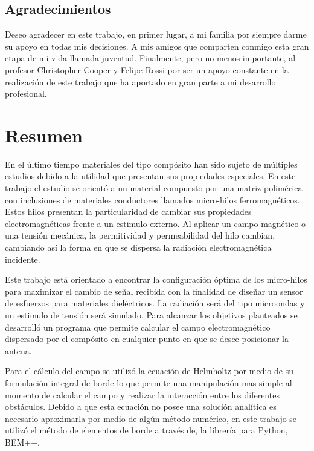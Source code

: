 \documentclass[12pt,letterpaper]{article}
\numberwithin{equation}{section}
\begin{document}
\begin{center}
	\section*{Agradecimientos}

	Deseo agradecer en este trabajo, en primer lugar, a mi familia por siempre darme su apoyo en todas mis decisiones. A mis amigos que comparten conmigo esta gran etapa de mi vida llamada juventud. Finalmente, pero no menos importante, al profesor Christopher Cooper y Felipe Rossi por ser un apoyo constante en la realización de este trabajo que ha aportado en gran parte a mi desarrollo profesional.

\end{center}


\pagebreak
\section*{Resumen}
En el último tiempo materiales del tipo compósito han sido sujeto de múltiples estudios debido a la utilidad que presentan sus propiedades especiales. En este trabajo el estudio se orientó a un material compuesto por una matriz polimérica con inclusiones de materiales conductores llamados micro-hilos ferromagnéticos. Estos hilos presentan la particularidad de cambiar sus propiedades electromagnéticas frente a un estimulo externo. Al aplicar un campo magnético o una tensión mecánica, la permitividad y permeabilidad del hilo cambian, cambiando así la forma en que se dispersa la radiación electromagnética incidente.

Este trabajo está orientado a encontrar la configuración óptima de los micro-hilos para maximizar el cambio de señal recibida con la finalidad de diseñar un sensor de esfuerzos para materiales dieléctricos. La radiación será del tipo microondas y un estimulo de tensión será simulado. Para alcanzar los objetivos planteados se desarrolló un programa que permite calcular el campo electromagnético dispersado por el compósito en cualquier punto en que se desee posicionar la antena.

Para el cálculo del campo se utilizó la ecuación de Helmholtz por medio de su formulación integral de borde lo que permite una manipulación mas simple al momento de calcular el campo y realizar la interacción entre los diferentes obstáculos. Debido a que esta ecuación no posee una solución analítica es necesario aproximarla por medio de algún método numérico, en este trabajo se utilizó el método de elementos de borde a través de, la librería para Python, BEM++.
\end{document}
